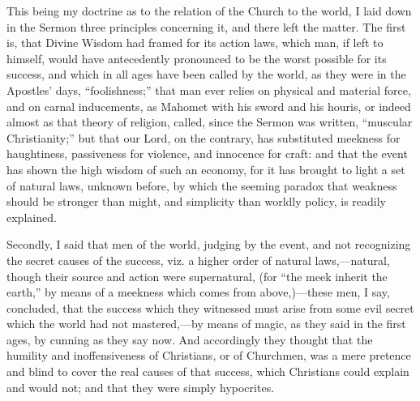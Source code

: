 This being my doctrine as to the relation of the Church to the world,
I laid down in the Sermon three principles concerning it, and there left
the matter. The first is, that Divine Wisdom had framed for its action
laws, which man, if left to himself, would have antecedently pronounced
to be the worst possible for its success, and which in all ages have
been called by the world, as they were in the Apostles' days,
``foolishness;'' that man ever relies on physical and material
force, and on carnal inducements, as Mahomet with his sword and his
houris, or indeed almost as that theory of religion, called, since the
Sermon was written, ``muscular Christianity;'' but that our
Lord, on the contrary, has substituted meekness for haughtiness,
passiveness for violence, and innocence for craft: and that the event
has shown the high wisdom of such an economy, for it has brought to
light a set of natural laws, unknown before, by which the seeming
paradox that weakness should be stronger than might, and simplicity than
worldly policy, is readily explained.

Secondly, I said that men of the world, judging by the event, and not
recognizing the secret causes of the success, viz. a higher order of
natural laws,—natural, though their source and action were
supernatural, (for ``the meek inherit the earth,'' by means of a
meekness which comes from above,)—these men, I say, concluded, that
the success which they witnessed must arise from some evil secret which
the world had not mastered,—by means of magic, as they said in
the first ages, by cunning as they say now. And accordingly they thought
that the humility and inoffensiveness of Christians, or of Churchmen,
was a mere pretence and blind to cover the real causes of that success,
which Christians could explain and would not; and that they were simply
hypocrites.


